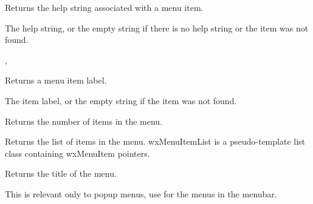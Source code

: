 Returns the help string associated with a menu item.




The help string, or the empty string if there is no help string or the
item was not found.


, 

\label{wxmenugetlabel}


Returns a menu item label.




The item label, or the empty string if the item was not found.



\label{wxmenugetmenuitemcount}


Returns the number of items in the menu.

\label{wxmenugetmenuitems}


Returns the list of items in the menu. wxMenuItemList is a pseudo-template
list class containing wxMenuItem pointers.

\label{wxmenugettitle}


Returns the title of the menu.


This is relevant only to popup menus, use 
 for the menus in the
menubar.



